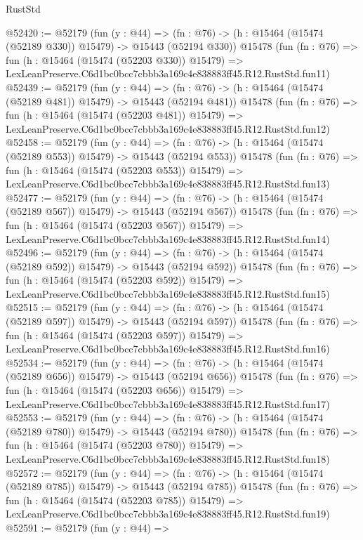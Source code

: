\begin{lexlean}{RustStd}
\begin{coremodule}
@52420 := @52179
    (fun (y : @44) =>
    (fn : @76) -> (h : @15464 (@15474 (@52189 @330)) @15479) -> @15443 (@52194 @330))
    @15478
    (fun (fn : @76) =>
    fun (h : @15464 (@15474 (@52203 @330)) @15479) =>
    LexLeanPreserve.C6d1bc0bcc7cbbb3a169c4e838883ff45.R12.RustStd.fun11)
@52439 := @52179
    (fun (y : @44) =>
    (fn : @76) -> (h : @15464 (@15474 (@52189 @481)) @15479) -> @15443 (@52194 @481))
    @15478
    (fun (fn : @76) =>
    fun (h : @15464 (@15474 (@52203 @481)) @15479) =>
    LexLeanPreserve.C6d1bc0bcc7cbbb3a169c4e838883ff45.R12.RustStd.fun12)
@52458 := @52179
    (fun (y : @44) =>
    (fn : @76) -> (h : @15464 (@15474 (@52189 @553)) @15479) -> @15443 (@52194 @553))
    @15478
    (fun (fn : @76) =>
    fun (h : @15464 (@15474 (@52203 @553)) @15479) =>
    LexLeanPreserve.C6d1bc0bcc7cbbb3a169c4e838883ff45.R12.RustStd.fun13)
@52477 := @52179
    (fun (y : @44) =>
    (fn : @76) -> (h : @15464 (@15474 (@52189 @567)) @15479) -> @15443 (@52194 @567))
    @15478
    (fun (fn : @76) =>
    fun (h : @15464 (@15474 (@52203 @567)) @15479) =>
    LexLeanPreserve.C6d1bc0bcc7cbbb3a169c4e838883ff45.R12.RustStd.fun14)
@52496 := @52179
    (fun (y : @44) =>
    (fn : @76) -> (h : @15464 (@15474 (@52189 @592)) @15479) -> @15443 (@52194 @592))
    @15478
    (fun (fn : @76) =>
    fun (h : @15464 (@15474 (@52203 @592)) @15479) =>
    LexLeanPreserve.C6d1bc0bcc7cbbb3a169c4e838883ff45.R12.RustStd.fun15)
@52515 := @52179
    (fun (y : @44) =>
    (fn : @76) -> (h : @15464 (@15474 (@52189 @597)) @15479) -> @15443 (@52194 @597))
    @15478
    (fun (fn : @76) =>
    fun (h : @15464 (@15474 (@52203 @597)) @15479) =>
    LexLeanPreserve.C6d1bc0bcc7cbbb3a169c4e838883ff45.R12.RustStd.fun16)
@52534 := @52179
    (fun (y : @44) =>
    (fn : @76) -> (h : @15464 (@15474 (@52189 @656)) @15479) -> @15443 (@52194 @656))
    @15478
    (fun (fn : @76) =>
    fun (h : @15464 (@15474 (@52203 @656)) @15479) =>
    LexLeanPreserve.C6d1bc0bcc7cbbb3a169c4e838883ff45.R12.RustStd.fun17)
@52553 := @52179
    (fun (y : @44) =>
    (fn : @76) -> (h : @15464 (@15474 (@52189 @780)) @15479) -> @15443 (@52194 @780))
    @15478
    (fun (fn : @76) =>
    fun (h : @15464 (@15474 (@52203 @780)) @15479) =>
    LexLeanPreserve.C6d1bc0bcc7cbbb3a169c4e838883ff45.R12.RustStd.fun18)
@52572 := @52179
    (fun (y : @44) =>
    (fn : @76) -> (h : @15464 (@15474 (@52189 @785)) @15479) -> @15443 (@52194 @785))
    @15478
    (fun (fn : @76) =>
    fun (h : @15464 (@15474 (@52203 @785)) @15479) =>
    LexLeanPreserve.C6d1bc0bcc7cbbb3a169c4e838883ff45.R12.RustStd.fun19)
@52591 := @52179
    (fun (y : @44) =>

\end{coremodule}
\end{lexlean}
